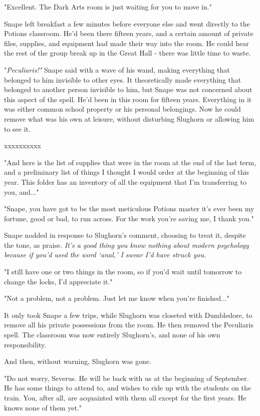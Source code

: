 \documentclass[a4paper,11pt]{article}
\begin{document}
"Excellent. The Dark Arts room is just waiting for you to move in."

Snape left breakfast a few minutes before everyone else and went directly to the Potions classroom. He'd been there fifteen years, and a certain amount of private files, supplies, and equipment had made their way into the room. He could hear the rest of the group break up in the Great Hall - there was little time to waste.

"\emph{Peculiaris!"} Snape said with a wave of his wand, making everything that belonged to him invisible to other eyes. It theoretically made everything that belonged to another person invisible to him, but Snape was not concerned about this aspect of the spell. He'd been in this room for fifteen years. Everything in it was either common school property or his personal belongings. Now he could remove what was his own at leisure, without disturbing Slughorn or allowing him to see it.

xxxxxxxxxx

"And here is the list of supplies that were in the room at the end of the last term, and a preliminary list of things I thought I would order at the beginning of this year. This folder has an inventory of all the equipment that I'm transferring to you, and..."

"Snape, you have got to be the most meticulous Potions master it's ever been my fortune, good or bad, to run across. For the work you're saving me, I thank you."

Snape nodded in response to Slughorn's comment, choosing to treat it, despite the tone, as praise. \emph{It's a good thing you know nothing about modern psychology because if you'd used the word `anal,' I swear I'd have struck you.}

"I still have one or two things in the room, so if you'd wait until tomorrow to change the locks, I'd appreciate it."

"Not a problem, not a problem. Just let me know when you're finished..."

It only took Snape a few trips, while Slughorn was closeted with Dumbledore, to remove all his private possessions from the room. He then removed the Peculiaris spell. The classroom was now entirely Slughorn's, and none of his own responsibility.

And then, without warning, Slughorn was gone.

"Do not worry, Severus. He will be back with us at the beginning of September. He has some things to attend to, and wishes to ride up with the students on the train. You, after all, are acquainted with them all except for the first years. He knows none of them yet."
\end{document}
